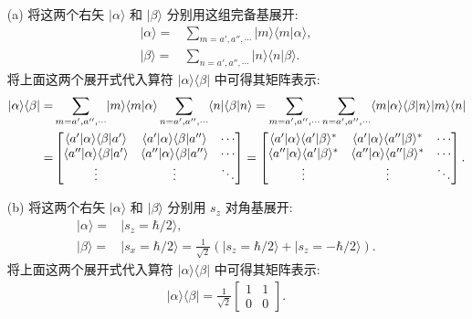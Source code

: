 \documentclass{assignment}
\begin{document}
\begin{sol}
    \begin{itemize}
        \item[(a)] 将这两个右矢 $\lvert\alpha\rangle$ 和 $\lvert\beta\rangle$ 分别用这组完备基展开:
        \begin{align}
            \lvert\alpha\rangle=&\sum_{m=a',a'',\cdots}\lvert m\rangle\langle m\vert\alpha\rangle,\\
            \lvert\beta\rangle=&\sum_{n=a',a'',\cdots}\lvert n\rangle\langle n\vert\beta\rangle.
        \end{align}
        将上面这两个展开式代入算符 $\lvert\alpha\rangle\langle\beta\rvert$ 中可得其矩阵表示:
        \begin{align}
            \notag\lvert\alpha\rangle\langle\beta\rvert=&\sum_{m=a',a'',\cdots}\lvert m\rangle\langle m\vert\alpha\rangle\sum_{n=a',a'',\cdots}\langle n\rvert\langle\beta\vert n\rangle=\sum_{m=a',a'',\cdots}\sum_{n=a',a'',\cdots}\langle m\vert\alpha\rangle\langle\beta\vert n\rangle\lvert m\rangle\langle n\rvert\\
            =&\begin{bmatrix}
                \langle a'\vert\alpha\rangle\langle\beta\vert a'\rangle&\langle a'\vert\alpha\rangle\langle\beta\vert a''\rangle&\cdots\\
                \langle a''\vert\alpha\rangle\langle\beta\vert a'\rangle&\langle a''\vert\alpha\rangle\langle\beta\vert a''\rangle&\cdots\\
                \vdots&\vdots&\ddots
            \end{bmatrix}=\begin{bmatrix}
                \langle a'\vert\alpha\rangle\langle a'\vert \beta\rangle^*&\langle a'\vert\alpha\rangle\langle a''\vert\beta\rangle^*&\cdots\\
                \langle a''\vert\alpha\rangle\langle a'\vert\beta\rangle^*&\langle a''\vert\alpha\rangle\langle a''\vert\beta\rangle^*&\cdots\\
                \vdots&\vdots&\ddots
            \end{bmatrix}.
        \end{align}
        \item[(b)] 将这两个右矢 $\lvert\alpha\rangle$ 和 $\lvert\beta\rangle$ 分别用 $s_z$ 对角基展开:
        \begin{align}
            \lvert\alpha\rangle=&\lvert s_z=\hbar/2\rangle,\\
            \lvert\beta\rangle=&\lvert s_x=\hbar/2\rangle=\frac{1}{\sqrt{2}}(\lvert s_z=\hbar/2\rangle+\lvert s_z=-\hbar/2\rangle).
        \end{align}
        将上面这两个展开式代入算符 $\lvert\alpha\rangle\langle\beta\rvert$ 中可得其矩阵表示:
        \begin{align}
            \lvert\alpha\rangle\langle\beta\rvert=\frac{1}{\sqrt{2}}\begin{bmatrix}
                1&1\\
                0&0
            \end{bmatrix}.
        \end{align}
    \end{itemize}
\end{sol}
\end{document}
